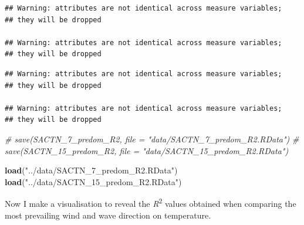 \documentclass[10pt,A4,]{article}
\newenvironment{Shaded}{\begin{snugshade}}{\end{snugshade}}
\newcommand{\KeywordTok}[1]{\textcolor[rgb]{0.13,0.29,0.53}{\textbf{#1}}}
\newcommand{\DecValTok}[1]{\textcolor[rgb]{0.00,0.00,0.81}{#1}}
\newcommand{\StringTok}[1]{\textcolor[rgb]{0.31,0.60,0.02}{#1}}
\newcommand{\CommentTok}[1]{\textcolor[rgb]{0.56,0.35,0.01}{\textit{#1}}}
\newcommand{\OperatorTok}[1]{\textcolor[rgb]{0.81,0.36,0.00}{\textbf{#1}}}
\newcommand{\NormalTok}[1]{#1}
\begin{document}
\begin{verbatim}
## Warning: attributes are not identical across measure variables;
## they will be dropped

## Warning: attributes are not identical across measure variables;
## they will be dropped
\end{verbatim}

\begin{Shaded}
\end{Shaded}

\begin{verbatim}
## Warning: attributes are not identical across measure variables;
## they will be dropped

## Warning: attributes are not identical across measure variables;
## they will be dropped
\end{verbatim}

\begin{Shaded}
\begin{Highlighting}[]
\CommentTok{# save(SACTN_7_predom_R2, file = "data/SACTN_7_predom_R2.RData")}
\CommentTok{# save(SACTN_15_predom_R2, file = "data/SACTN_15_predom_R2.RData")}

\KeywordTok{load}\NormalTok{(}\StringTok{"../data/SACTN_7_predom_R2.RData"}\NormalTok{)}
\KeywordTok{load}\NormalTok{(}\StringTok{"../data/SACTN_15_predom_R2.RData"}\NormalTok{)}
\end{Highlighting}
\end{Shaded}

Now I make a visualisation to reveal the \emph{R}\textsuperscript{2}
values obtained when comparing the most prevailing wind and wave
direction on temperature.
\end{document}

